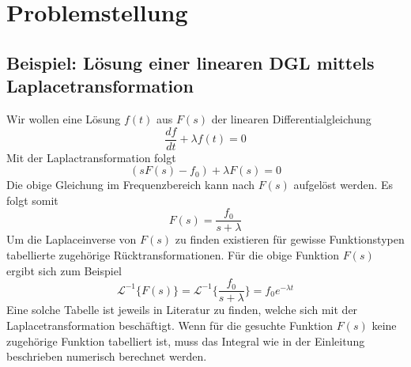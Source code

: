 %
%
%



\section{Problemstellung
\label{laplace:section:problemstellung}}
\subsection{Beispiel: Lösung einer linearen DGL mittels Laplacetransformation}
Wir wollen eine Lösung $f(t)$ aus $F(s)$ der linearen Differentialgleichung 
\[
\frac{df}{dt} + \lambda f(t) = 0
\]
Mit der Laplactransformation folgt
\[
(sF(s) - f_{0}) + \lambda F(s) = 0
\]
Die obige Gleichung im Frequenzbereich kann nach $F(s)$ aufgelöst werden.
Es folgt somit
\[
F(s) = \frac{f_{0}}{s + \lambda}
\]
Um die Laplaceinverse von $F(s)$ zu finden existieren für gewisse Funktionstypen tabellierte zugehörige Rücktransformationen.
Für die obige Funktion $F(s)$ ergibt sich zum Beispiel
\[
\mathcal{L}^{-1}\{F(s)\}=\mathcal{L}^{-1}\{\frac{f_{0}}{s+\lambda}\} = f_{0}e^{-\lambda t}
\]
Eine solche Tabelle ist jeweils in Literatur zu finden, welche sich mit der Laplacetransformation beschäftigt.
Wenn für die gesuchte Funktion $F(s)$ keine zugehörige Funktion tabelliert ist, muss das Integral wie in der Einleitung beschrieben numerisch berechnet werden.

